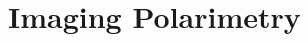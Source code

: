 \documentclass[oneside,a4,12p]{report} %
\begin{document}
%
%
%



\chapter{Imaging Polarimetry}
\end{document}
